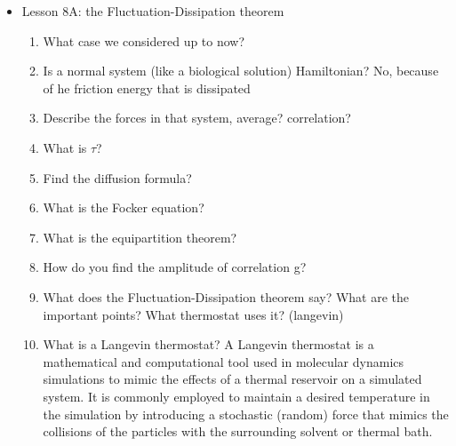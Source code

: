 {\begin{itemize}
\begin{enumerate}
	\item What steps would you alike to follow to proceed with the coarse graining?
	\item what is the markov property? and how do you use it in this context?
        \item What is hte Smoluchovski equation?
        \item How do you write the infinitesimal change of f in time? What equation does it reminds?
        \item Find the probability of finding a particle at position r after time t (Fokker Plank equation )
        \item How are newtonian systems positions related to the time of simulation
        \item How Diffusion dynamics is different? What is the general solution?
        \item Make an example of solving equation of dynamics for diffusion
    \end{enumerate}
    \item Lesson 8A: the Fluctuation-Dissipation theorem
    \begin{enumerate}
        \item What case we considered up to now?
        \item Is a normal system (like a biological solution) Hamiltonian? No, because of he friction energy that is dissipated
        \item Describe the forces in that system, average? correlation?
        \item What is $\tau$?
        \item Find the diffusion formula?
        \item What is the Focker equation?
        \item What is the equipartition theorem?
        \item How do you find the amplitude of correlation g?
        \item What does the Fluctuation-Dissipation theorem say? What are the important points? What thermostat uses it? (langevin)
        \item What is a Langevin thermostat? A Langevin thermostat is a mathematical and computational tool used in molecular dynamics simulations to mimic the effects of a thermal reservoir on a simulated system. It is commonly employed to maintain a desired temperature in the simulation by introducing a stochastic (random) force that mimics the collisions of the particles with the surrounding solvent or thermal bath.

\end{enumerate}
\end{itemize}}
